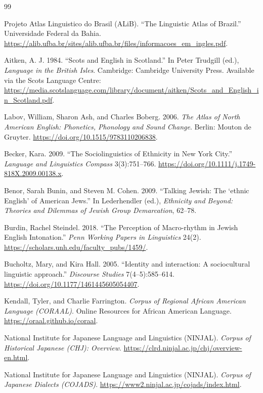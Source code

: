 \documentclass[11pt]{article}
\begin{document}
\begin{thebibliography}{99}

Projeto Atlas Linguistico do Brasil (ALiB).
``The Linguistic Atlas of Brazil.''
Universidade Federal da Bahia.
\url{https://alib.ufba.br/sites/alib.ufba.br/files/informacoes_em_ingles.pdf}.

Aitken, A. J. 1984.
``Scots and English in Scotland.''
In Peter Trudgill (ed.), \emph{Language in the British Isles}.
Cambridge: Cambridge University Press.
Available via the Scots Language Centre:
\url{https://media.scotslanguage.com/library/document/aitken/Scots_and_English_in_Scotland.pdf}.

Labov, William, Sharon Ash, and Charles Boberg. 2006.
\emph{The Atlas of North American English: Phonetics, Phonology and Sound
Change}.
Berlin: Mouton de Gruyter.
\url{https://doi.org/10.1515/9783110206838}.

Becker, Kara. 2009.
``The Sociolinguistics of Ethnicity in New York City.''
\emph{Language and Linguistics Compass} 3(3):751--766.
\url{https://doi.org/10.1111/j.1749-818X.2009.00138.x}.

Benor, Sarah Bunin, and Steven M. Cohen. 2009.
``Talking Jewish: The `ethnic English' of American Jews.''
In Lederhendler (ed.), \emph{Ethnicity and Beyond: Theories and Dilemmas of
Jewish Group Demarcation}, 62--78.

Burdin, Rachel Steindel. 2018.
``The Perception of Macro-rhythm in Jewish English Intonation.''
\emph{Penn Working Papers in Linguistics} 24(2).
\url{https://scholars.unh.edu/faculty_pubs/1459/}.

Bucholtz, Mary, and Kira Hall. 2005.
``Identity and interaction: A sociocultural linguistic approach.''
\emph{Discourse Studies} 7(4--5):585--614.
\url{https://doi.org/10.1177/1461445605054407}.

Kendall, Tyler, and Charlie Farrington.
\emph{Corpus of Regional African American Language (CORAAL)}.
Online Resources for African American Language.
\url{https://oraal.github.io/coraal}.

National Institute for Japanese Language and Linguistics (NINJAL).
\emph{Corpus of Historical Japanese (CHJ): Overview}.
\url{https://clrd.ninjal.ac.jp/chj/overview-en.html}.

National Institute for Japanese Language and Linguistics (NINJAL).
\emph{Corpus of Japanese Dialects (COJADS)}.
\url{https://www2.ninjal.ac.jp/cojads/index.html}.


\end{thebibliography}
\end{document}
